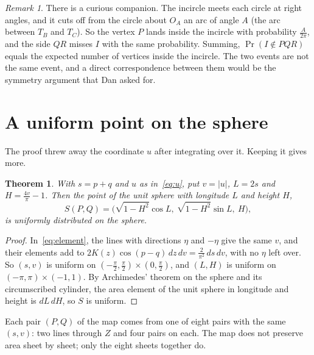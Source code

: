 \documentclass[11pt]{article}
\newtheorem{theorem}{Theorem}
\theoremstyle{remark}
\newtheorem*{remark}{Remark}
\begin{document}
\begin{remark}
There is a curious companion. The incircle meets each circle at right angles, and it cuts off from
the circle about $O_A$ an arc of angle $A$ (the arc between $T_B$ and $T_C$). So the vertex $P$ lands
inside the incircle with probability $\frac{A}{2\pi}$, and the side $QR$ misses $I$ with the same
probability. Summing, $\Pr(I\notin PQR)$ equals the expected number of vertices inside the incircle.
The two events are not the same event, and a direct correspondence between them would be the
symmetry argument that Dan asked for.
\end{remark}

\section{A uniform point on the sphere}\label{sec:sphere}

The proof threw away the coordinate $u$ after integrating over it. Keeping it gives more.

\begin{theorem}\label{thm:sphere}
With $s=p+q$ and $u$ as in~\eqref{eq:u}, put $v=|u|$, $L=2s$ and $H=\frac{4v}{\pi}-1$. Then the point
of the unit sphere with longitude $L$ and height $H$,
\[
  S(P,Q)=\bigl(\sqrt{1-H^2}\cos L,\ \sqrt{1-H^2}\sin L,\ H\bigr),
\]
is uniformly distributed on the sphere.
\end{theorem}

\begin{proof}
In~\eqref{eq:element}, the lines with directions $\eta$ and $-\eta$ give the same $v$, and their
elements add to $2K(z)\cos(p-q)\,dz\,dv=\frac{2}{\pi^2}\,ds\,dv$, with no $\eta$ left over. So
$(s,v)$ is uniform on $(-\frac\pi2,\frac\pi2)\times(0,\frac\pi2)$, and $(L,H)$ is uniform on
$(-\pi,\pi)\times(-1,1)$. By Archimedes' theorem on the sphere and its circumscribed cylinder, the
area element of the unit sphere in longitude and height is $dL\,dH$, so $S$ is uniform.
\end{proof}

Each pair $(P,Q)$ of the map comes from one of eight pairs with the same $(s,v)$: two lines through
$Z$ and four pairs on each. The map does not preserve area sheet by sheet; only the eight sheets
together do.
\end{document}
